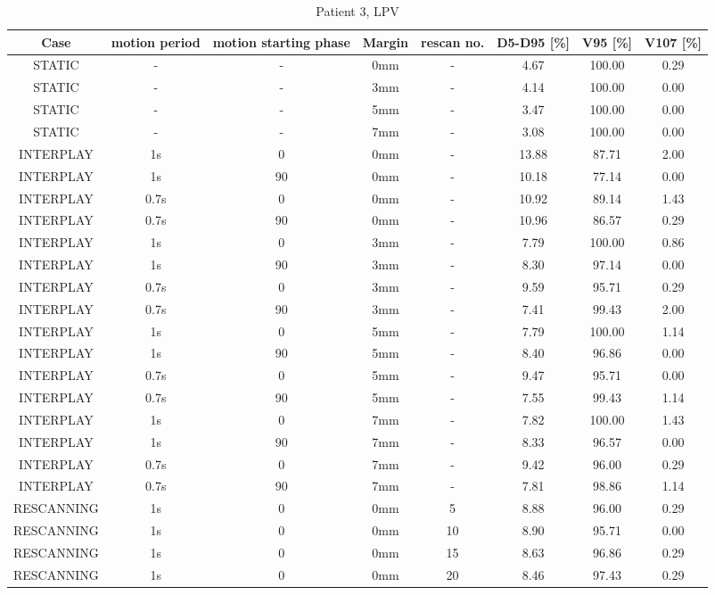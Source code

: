 \begin{table}[H]
  \centering
  \tiny
  \caption{Patient 3, LPV}
  \begin{tabular}{|c||c|c|c|c||c|c|c|}
    \hline\hline
    Case & motion period & motion starting phase & Margin & rescan no. & D5-D95 [\%] & V95 [\%] & V107 [\%] \\
    \hline 
STATIC & - & - & 0mm & - & 4.67 & 100.00 & 0.29 \\
STATIC & - & - & 3mm & - & 4.14 & 100.00 & 0.00 \\
STATIC & - & - & 5mm & - & 3.47 & 100.00 & 0.00 \\
STATIC & - & - & 7mm & - & 3.08 & 100.00 & 0.00 \\
INTERPLAY & 1s & 0 & 0mm & - & 13.88 & 87.71 & 2.00 \\
INTERPLAY & 1s & 90 & 0mm & - & 10.18 & 77.14 & 0.00 \\
INTERPLAY & 0.7s & 0 & 0mm & - & 10.92 & 89.14 & 1.43 \\
INTERPLAY & 0.7s & 90 & 0mm & - & 10.96 & 86.57 & 0.29 \\
INTERPLAY & 1s & 0 & 3mm & - & 7.79 & 100.00 & 0.86 \\
INTERPLAY & 1s & 90 & 3mm & - & 8.30 & 97.14 & 0.00 \\
INTERPLAY & 0.7s & 0 & 3mm & - & 9.59 & 95.71 & 0.29 \\
INTERPLAY & 0.7s & 90 & 3mm & - & 7.41 & 99.43 & 2.00 \\
INTERPLAY & 1s & 0 & 5mm & - & 7.79 & 100.00 & 1.14 \\
INTERPLAY & 1s & 90 & 5mm & - & 8.40 & 96.86 & 0.00 \\
INTERPLAY & 0.7s & 0 & 5mm & - & 9.47 & 95.71 & 0.00 \\
INTERPLAY & 0.7s & 90 & 5mm & - & 7.55 & 99.43 & 1.14 \\
INTERPLAY & 1s & 0 & 7mm & - & 7.82 & 100.00 & 1.43 \\
INTERPLAY & 1s & 90 & 7mm & - & 8.33 & 96.57 & 0.00 \\
INTERPLAY & 0.7s & 0 & 7mm & - & 9.42 & 96.00 & 0.29 \\
INTERPLAY & 0.7s & 90 & 7mm & - & 7.81 & 98.86 & 1.14 \\
RESCANNING & 1s & 0 & 0mm & 5 & 8.88 & 96.00 & 0.29 \\
RESCANNING & 1s & 0 & 0mm & 10 & 8.90 & 95.71 & 0.00 \\
RESCANNING & 1s & 0 & 0mm & 15 & 8.63 & 96.86 & 0.29 \\
RESCANNING & 1s & 0 & 0mm & 20 & 8.46 & 97.43 & 0.29 \\

\end{tabular}
\end{table}
